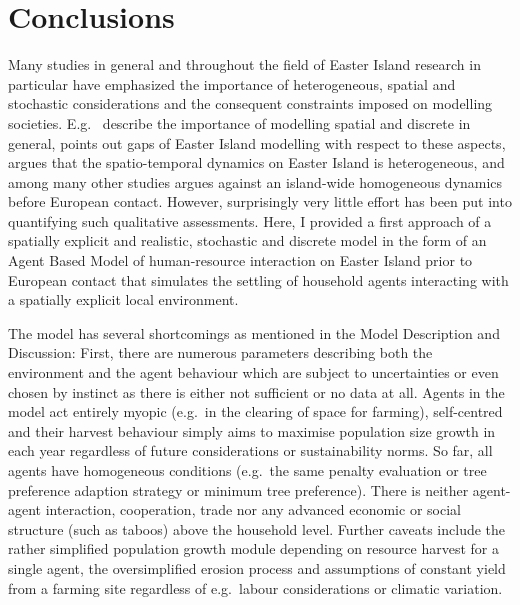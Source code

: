 
\chapter{Conclusions}

Many studies in general and throughout the field of Easter Island research in particular have emphasized the importance of heterogeneous, spatial and stochastic considerations and the consequent constraints imposed on modelling societies.
E.g.\ \citet{Bousquet2004} describe the importance of modelling spatial and discrete in general, \citet{Merico2017} points out gaps of Easter Island modelling with respect to these aspects, \citet{Rull2020} argues that the spatio-temporal dynamics on Easter Island is heterogeneous, and \citet{Stevenson2015} among many other studies argues against an island-wide homogeneous dynamics before European contact.
However, surprisingly very little effort has been put into quantifying such qualitative assessments.
Here, I provided a first approach of a spatially explicit and realistic, stochastic and discrete model in the form of an Agent Based Model of human-resource interaction on Easter Island prior to European contact that simulates the settling of household agents interacting with a spatially explicit local environment. 

The model has several shortcomings as mentioned in the Model Description and Discussion:
First, there are numerous parameters describing both the environment and the agent behaviour which are subject to uncertainties or even chosen by instinct as there is either not sufficient or no data at all.
Agents in the model act entirely myopic (e.g.\ in the clearing of space for farming), self-centred and their harvest behaviour simply aims to maximise population size growth in each year regardless of future considerations or sustainability norms. 
So far, all agents have homogeneous conditions (e.g.\ the same penalty evaluation or tree preference adaption strategy or minimum tree preference).
There is neither agent-agent interaction, cooperation, trade nor any advanced economic or social structure (such as taboos) above the household level. 
Further caveats include the rather simplified population growth module depending on resource harvest for a single agent, the oversimplified erosion process and assumptions of constant yield from a farming site regardless of e.g.\ labour considerations or climatic variation.


